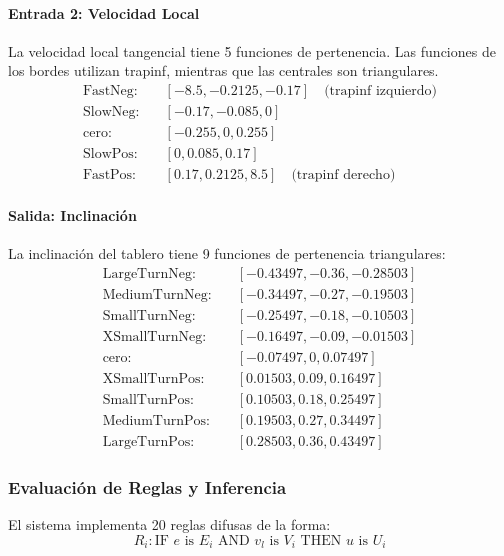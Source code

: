 \documentclass[
A4paper,            1 paper size A4
oneside,            %
openright,          %
10pt,               %
headings=normal,    %
titlepage=on        %
]{article}
\begin{document}
\paragraph{Entrada 2: Velocidad Local}
La velocidad local tangencial tiene 5 funciones de pertenencia. Las funciones de los bordes utilizan trapinf, mientras que las centrales son triangulares.
\begin{align}
    \text{FastNeg:} &\quad [-8.5, -0.2125, -0.17] \quad \text{(trapinf izquierdo)} \\
    \text{SlowNeg:} &\quad [-0.17, -0.085, 0] \\
    \text{cero:} &\quad [-0.255, 0, 0.255] \\
    \text{SlowPos:} &\quad [0, 0.085, 0.17] \\
    \text{FastPos:} &\quad [0.17, 0.2125, 8.5] \quad \text{(trapinf derecho)}
\end{align}

\paragraph{Salida: Inclinación}
La inclinación del tablero tiene 9 funciones de pertenencia triangulares:
\begin{align} \text{LargeTurnNeg:} &\quad [-0.43497, -0.36, -0.28503] \\ \text{MediumTurnNeg:} &\quad [-0.34497, -0.27, -0.19503] \\ \text{SmallTurnNeg:} &\quad [-0.25497, -0.18, -0.10503] \\ \text{XSmallTurnNeg:} &\quad [-0.16497, -0.09, -0.01503] \\ 
\text{cero:} &\quad [-0.07497, 0, 0.07497] \\ 
\text{XSmallTurnPos:} &\quad [0.01503, 0.09, 0.16497] \\ 
\text{SmallTurnPos:} &\quad [0.10503, 0.18, 0.25497] \\ 
\text{MediumTurnPos:} &\quad [0.19503, 0.27, 0.34497] \\ \text{LargeTurnPos:} &\quad [0.28503, 0.36, 0.43497] \end{align}

\subsubsection{Evaluación de Reglas y Inferencia}
El sistema implementa 20 reglas difusas de la forma:
\begin{equation}
    R_i: \text{IF } e \text{ is } E_i \text{ AND } v_l \text{ is } V_i \text{ THEN } u \text{ is } U_i
\end{equation}
\end{document}
